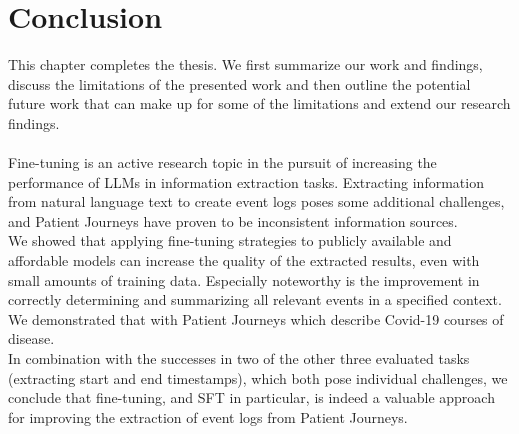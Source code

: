 \section{Conclusion}\label{sec:conclusion}
This chapter completes the thesis. We first summarize our work and findings, discuss the limitations of the presented work and then outline the potential future work that can make up for some of the limitations and extend our research findings.\\\\
Fine-tuning is an active research topic in the pursuit of increasing the performance of LLMs in information extraction tasks. Extracting information from natural language text to create event logs poses some additional challenges, and Patient Journeys have proven to be inconsistent information sources.\\
We showed that applying fine-tuning strategies to publicly available and affordable models can increase the quality of the extracted results, even with small amounts of training data. Especially noteworthy is the improvement in correctly determining and summarizing all relevant events in a specified context. We demonstrated that with Patient Journeys which describe Covid-19 courses of disease.\\
In combination with the successes in two of the other three evaluated tasks (extracting start and end timestamps), which both pose individual challenges, we conclude that fine-tuning, and SFT in particular, is indeed a valuable approach for improving the extraction of event logs from Patient Journeys.

